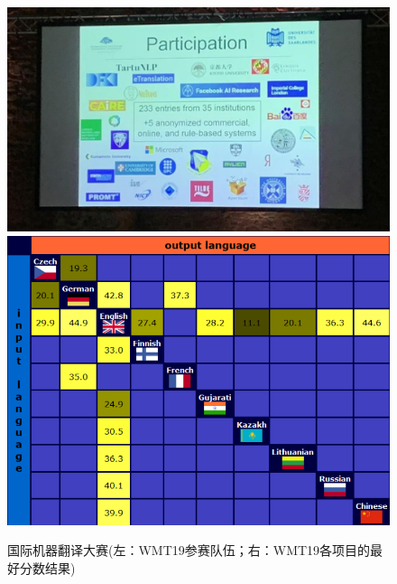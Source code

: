 \begin{figure}[htp]
    \centering
\includegraphics[scale=0.3]{./Chapter1/Figures/figure-wmt-participation.jpg}
\includegraphics[scale=0.3]{./Chapter1/Figures/figure-wmt-bestresults.jpg}
\setlength{\belowcaptionskip}{-1.5em}
    \caption{国际机器翻译大赛(左：WMT19参赛队伍；右：WMT19各项目的最好分数结果)}
    \label{fig:1-6}
\end{figure}


\sectionnewpage
